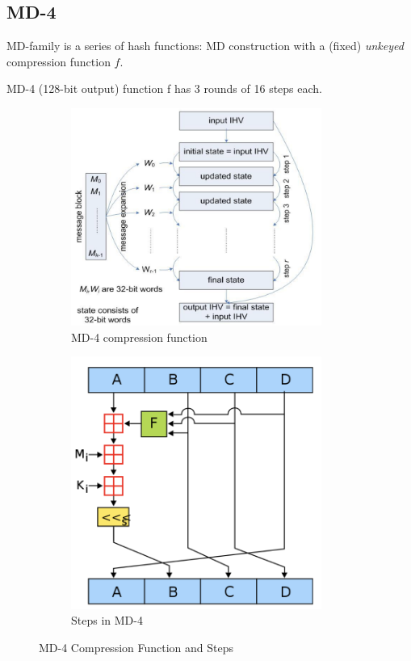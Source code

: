 \subsection{MD-4}
MD-family is a series of hash functions: MD construction with a (fixed) \emph{unkeyed} compression function $f$.


MD-4 (128-bit output) function f has 3 rounds of 16 steps each.

\begin{figure}[h!]
    \centering
    \begin{subfigure}{0.45\textwidth}
        \centering
        \includegraphics[width=0.9\textwidth]{img/md4.png}
        \caption{MD-4 compression function}
    \end{subfigure}
    \hfill
    \begin{subfigure}{0.45\textwidth}
        \centering
        \includegraphics[width=0.9\textwidth]{img/md4steps.png}
        \caption{Steps in MD-4}
    \end{subfigure}
    \caption{MD-4 Compression Function and Steps}
\end{figure}




